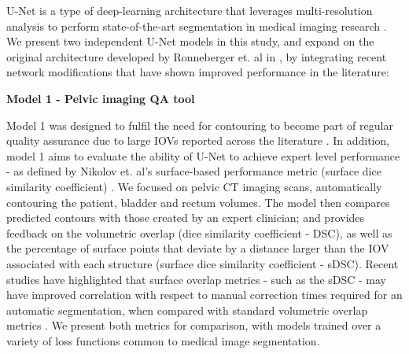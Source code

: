 U-Net is a type of deep-learning architecture that leverages multi-resolution analysis to perform state-of-the-art segmentation in medical imaging research \cite{Kazemifar_2018, Zhu_2018}. We present two independent U-Net models in this study, and expand on the original architecture developed by Ronneberger et. al in \cite{Ronneberger_2015}, by integrating recent network  modifications that have shown improved performance in the literature: 

\textbf{Model 1 - Pelvic imaging QA tool}

Model 1 was designed to fulfil the need for contouring to become part of regular quality assurance due to large IOVs reported across the literature \cite{Vinod_2016}. In addition, model 1 aims to evaluate the ability of U-Net to achieve expert level performance - as defined by Nikolov et. al's surface-based performance metric (surface dice similarity coefficient) \cite{Nikolov_2018}. We focused on pelvic CT imaging scans, automatically contouring the patient, bladder and rectum volumes. The model then compares predicted contours with those created by an expert clinician; and provides feedback on the volumetric overlap (dice similarity coefficient - DSC), as well as the percentage of surface points that deviate by a distance larger than the IOV associated with each structure (surface dice similarity coefficient - sDSC). Recent studies have highlighted that surface overlap metrics - such as the sDSC - may have improved correlation with respect to manual correction times required for an automatic segmentation, when compared with standard volumetric overlap metrics \cite{Vaassen_2020}. We present both metrics for comparison, with models trained over a variety of loss functions common to medical image segmentation.

